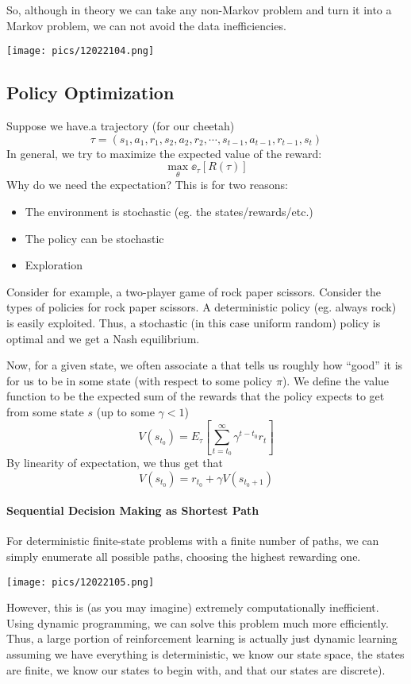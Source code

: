 \documentclass[11pt]{scrartcl}
\begin{document}
So, although in theory we can take any non-Markov problem and turn it into a Markov problem, we can not avoid the data inefficiencies. 
\begin{center}
    \texttt{[image: pics/12022104.png]}
\end{center}

\subsection{Policy Optimization}
Suppose we have.a trajectory (for our cheetah) $$\tau=(s_1,a_1,r_1,s_2,a_2,r_2,\cdots,s_{t-1},a_{t-1},r_{t-1}, s_{t})$$
In general, we try to maximize the expected value of the reward: $$\max_{\theta}\ee_{\tau}[R(\tau)]$$
Why do we need the expectation? This is for two reasons:
\begin{itemize}
    \item The environment is stochastic (eg. the states/rewards/etc.)
    \item The policy can be stochastic 
    \item Exploration 
\end{itemize}

\begin{ex}
Consider for example, a two-player game of rock paper scissors. Consider the types of policies for rock paper scissors. A deterministic policy (eg. always rock) is easily exploited. Thus, a stochastic (in this case uniform random) policy is optimal and we get a Nash equilibrium.
\end{ex}

Now, for a given state, we often associate a  that tells us roughly how ``good'' it is for us to be in some state (with respect to some policy $\pi$). We define the value function to be the expected sum of the rewards that the policy expects to get from some state $s$ (up to some  $\gamma < 1$)
\begin{equation*}
    V(s_{t_0}) = E_{\tau}\left[\sum_{t = t_0}^{\infty}\gamma^{t - t_0}r_t\right]
\end{equation*}
By linearity of expectation, we thus get that 
\begin{equation*}
    V(s_{t_0}) = r_{t_0} + \gamma V(s_{t_0 + 1})
\end{equation*}

\paragraph{Sequential Decision Making as Shortest Path}
For deterministic finite-state problems with a finite number of paths, we can simply enumerate all possible paths, choosing the highest rewarding one. 
\begin{center}
    \texttt{[image: pics/12022105.png]}
\end{center}
However, this is (as you may imagine) extremely computationally inefficient. Using dynamic programming, we can solve this problem much more efficiently. Thus, a large portion of reinforcement learning is actually just dynamic learning assuming we have everything is deterministic, we know our state space, the states are finite, we know our states to begin with, and that our states are discrete).
\end{document}
